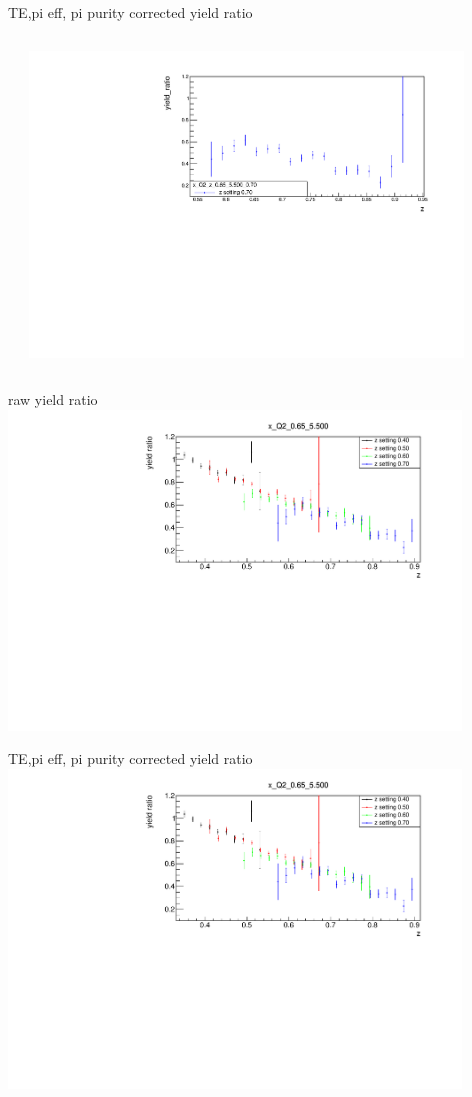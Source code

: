 \begin{frame}{TE,pi eff, pi purity corrected yield ratio}
\begin{columns}
\begin{column}[T]{0.5\textwidth}
\end{column}
\begin{column}[T]{0.5\textwidth}
\includegraphics[width = 0.9\textwidth]{results/yield/statistics_corr/x_Q2_z_0.65_5.500_0.70_ratio.pdf}
\end{column}
\end{columns}
\end{frame}
\begin{frame}{raw yield ratio}
\includegraphics[width = 0.9\textwidth]{results/yield/statistics/x_Q2_0.65_5.500_ratio.pdf}
\end{frame}
\begin{frame}{TE,pi eff, pi purity corrected yield ratio}
\includegraphics[width = 0.9\textwidth]{results/yield/statistics_corr/x_Q2_0.65_5.500_ratio.pdf}
\end{frame}
